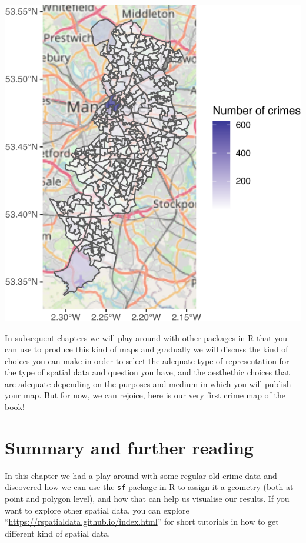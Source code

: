 \documentclass[
  krantz2]{krantz}
\begin{document}
\includegraphics{crime_mapping_files/figure-latex/unnamed-chunk-31-1.pdf}

In subsequent chapters we will play around with other packages in R that you can use to produce this kind of maps and gradually we will discuss the kind of choices you can make in order to select the adequate type of representation for the type of spatial data and question you have, and the aesthethic choices that are adequate depending on the purposes and medium in which you will publish your map. But for now, we can rejoice, here is our very first crime map of the book!

\hypertarget{summary-and-further-reading}{%
\section{Summary and further reading}\label{summary-and-further-reading}}

In this chapter we had a play around with some regular old crime data and discovered how we can use the \texttt{sf} package in R to assign it a geometry (both at point and polygon level), and how that can help us visualise our results. If you want to explore other spatial data, you can explore ``\url{https://rspatialdata.github.io/index.html}'' for short tutorials in how to get different kind of spatial data.
\end{document}
